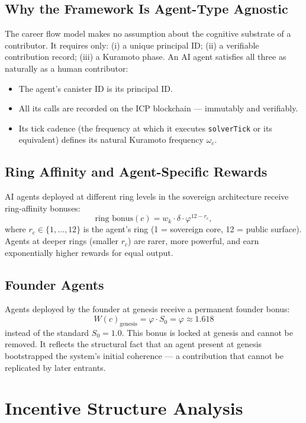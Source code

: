 \documentclass[12pt]{article}
\newcommand{\PHI}{\varphi}
\begin{document}
\subsection{Why the Framework Is Agent-Type Agnostic}

The career flow model makes no assumption about the cognitive substrate of a
contributor.  It requires only: (i) a unique principal ID; (ii) a verifiable
contribution record; (iii) a Kuramoto phase.  An AI agent satisfies all three
as naturally as a human contributor:

\begin{itemize}[leftmargin=*]
  \item The agent's canister ID is its principal ID.
  \item All its calls are recorded on the ICP blockchain — immutably and
    verifiably.
  \item Its tick cadence (the frequency at which it executes \texttt{solverTick}
    or its equivalent) defines its natural Kuramoto frequency $\omega_c$.
\end{itemize}

\subsection{Ring Affinity and Agent-Specific Rewards}

AI agents deployed at different ring levels in the sovereign architecture
receive ring-affinity bonuses:
\[
  \text{ring bonus}(c) = w_k \cdot \delta \cdot \PHI^{12 - r_c},
\]
where $r_c \in \{1, \ldots, 12\}$ is the agent's ring (1 = sovereign core,
12 = public surface).  Agents at deeper rings (smaller $r_c$) are rarer, more
powerful, and earn exponentially higher rewards for equal output.

\subsection{Founder Agents}

Agents deployed by the founder at genesis receive a permanent founder bonus:
\[
  W(c)_\text{genesis} = \PHI \cdot S_0 = \PHI \approx 1.618
\]
instead of the standard $S_0 = 1.0$.  This bonus is locked at genesis and
cannot be removed.  It reflects the structural fact that an agent present at
genesis bootstrapped the system's initial coherence — a contribution that
cannot be replicated by later entrants.

\section{Incentive Structure Analysis}
\label{sec:incentives}
\end{document}
